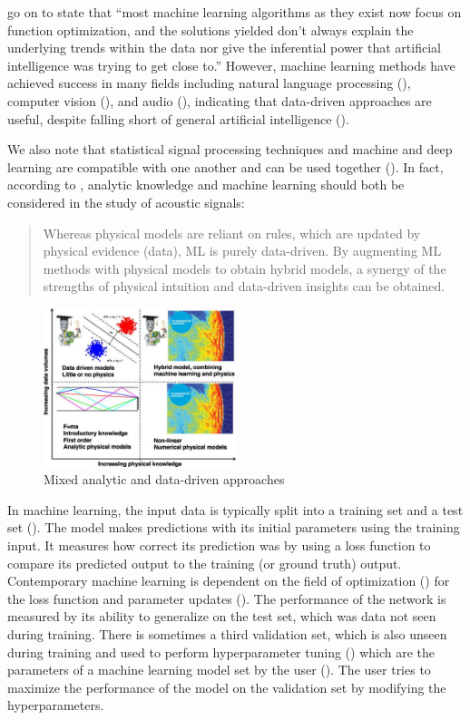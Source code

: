 \documentclass[report.tex]{subfiles}
\begin{document}
\textcite{introtodl} go on to state that ``most machine learning algorithms as they exist now focus on function optimization, and the solutions yielded don't always explain the underlying trends within the data nor give the inferential power that artificial intelligence was trying to get close to.'' However, machine learning methods have achieved success in many fields including natural language processing (\cite{nlpml}), computer vision (\cite{cvml}), and audio (\cite{audiodeeplearning}), indicating that data-driven approaches are useful, despite falling short of general artificial intelligence (\cite{generalai}).

We also note that statistical signal processing techniques and machine and deep learning are compatible with one another and can be used together (\cite{mlsp1, mlsp2}). In fact, according to \textcite{mldspmix}, analytic knowledge and machine learning should both be considered in the study of acoustic signals:

\begin{quote}
	Whereas physical models are reliant on rules, which are updated by physical evidence (data), ML is purely data-driven. By augmenting ML methods with physical models to obtain hybrid models, a synergy of the strengths of physical intuition and data-driven insights can be obtained.
\end{quote}

\begin{figure}[ht]
	\centering
	\includegraphics[width=0.5\textwidth]{./images-neural/dspmlmix.jpg}
	\caption{Mixed analytic and data-driven approaches}
	\label{fig:dspmlmix}
\end{figure}

In machine learning,  the input data is typically split into a training set and a test set (\cite{introtoml}). The model makes predictions with its initial parameters using the training input. It measures how correct its prediction was by using a loss function to compare its predicted output to the training (or ground truth) output. Contemporary machine learning is dependent on the field of optimization (\cite{boyd2004convex, mlopt1, mlopt2}) for the loss function and parameter updates (\cite{sgd}). The performance of the network is measured by its ability to generalize on the test set, which was data not seen during training. There is sometimes a third validation set, which is also unseen during training and used to perform hyperparameter tuning (\cite{splitvaliddata}) which are the parameters of a machine learning model set by the user (\cite{introtodl}). The user tries to maximize the performance of the model on the validation set by modifying the hyperparameters.
\end{document}
